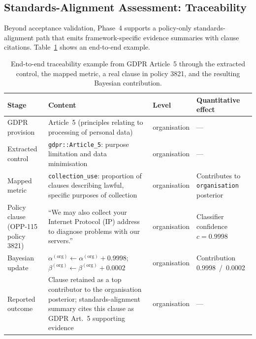 \documentclass[final,3p,times,twocolumn]{elsarticle}
\begin{document}
	\subsection{Standards-Alignment Assessment: Traceability}
	\label{sec:trace-example} Beyond acceptance validation, Phase~4 supports a policy-only
	standards-alignment path that emits framework-specific evidence summaries with
	clause citations. Table~\ref{tab:trace-example} shows an end-to-end example.

	\begin{table}
		[h]
		\centering
		\caption{End-to-end traceability example from GDPR Article~5 through the
		extracted control, the mapped metric, a real clause in policy 3821, and the resulting
		Bayesian contribution.}
		\label{tab:trace-example}
        
        
        \footnotesize
		\setlength{\tabcolsep}{4pt}
		\begin{tabular}{@{}p{} p{} p{} p{}@{}}
			\toprule \textbf{Stage}             & \textbf{Content}                                                                                                                                     & \textbf{Level} & \textbf{Quantitative effect}                   \\
			\midrule GDPR provision             & Article~5 (principles relating to processing of personal data)                                                                                       & organisation   & ---                                            \\
			Extracted control                   & \texttt{gdpr::Article\_5}: purpose limitation and data minimisation                                                                                  & organisation   & ---                                            \\
			Mapped metric                       & \texttt{collection\_use}: proportion of clauses describing lawful, specific purposes of collection                                                   & organisation   & Contributes to \texttt{organisation} posterior \\
			Policy clause (OPP-115 policy 3821) & ``We may also collect your Internet Protocol (IP) address to diagnose problems with our servers.''                                                   & organisation   & Classifier confidence $c = 0.9998$             \\
			Bayesian update                     & $\alpha^{(\text{org})}\leftarrow \alpha^{(\text{org})}+ 0.9998$; $\beta^{(\text{org})}\leftarrow \beta^{(\text{org})}+ 0.0002$                       & organisation   & Contribution 0.9998~/~0.0002                   \\
			Reported outcome                    & Clause retained as a top contributor to the organisation posterior; standards-alignment summary cites this clause as GDPR Art.~5 supporting evidence & organisation   & ---                                            \\
			\bottomrule
		\end{tabular}
	\end{table}
\end{document}
